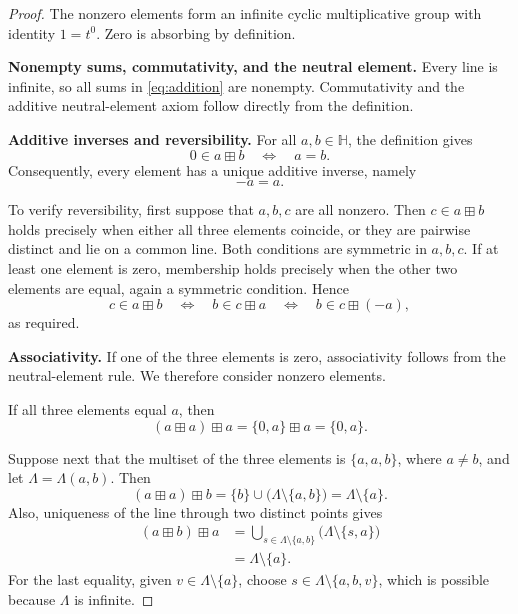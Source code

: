 \documentclass[11pt]{article}
\newcommand{\HH}{\mathbb{H}}
\begin{document}
\begin{proof}
The nonzero elements form an infinite cyclic multiplicative group with
identity \(1=t^0\). Zero is absorbing by definition.

\medskip
\noindent
\textbf{Nonempty sums, commutativity, and the neutral element.}
Every line is infinite, so all sums in \eqref{eq:addition} are nonempty.
Commutativity and the additive neutral-element axiom follow directly from
the definition.

\medskip
\noindent
\textbf{Additive inverses and reversibility.}
For all \(a,b\in\HH\), the definition gives
\begin{equation}\label{eq:inverse}
    0\in a\boxplus b
    \quad\Longleftrightarrow\quad a=b.
\end{equation}
Consequently, every element has a unique additive inverse, namely
\[
    -a=a.
\]

To verify reversibility, first suppose that \(a,b,c\) are all nonzero.
Then \(c\in a\boxplus b\) holds precisely when either all three elements
coincide, or they are pairwise distinct and lie on a common line.
Both conditions are symmetric in \(a,b,c\).
If at least one element is zero, membership holds precisely when the
other two elements are equal, again a symmetric condition. Hence
\[
    c\in a\boxplus b
    \quad\Longleftrightarrow\quad
    b\in c\boxplus a
    \quad\Longleftrightarrow\quad
    b\in c\boxplus(-a),
\]
as required.

\medskip
\noindent
\textbf{Associativity.}
If one of the three elements is zero, associativity follows from the
neutral-element rule. We therefore consider nonzero elements.

If all three elements equal \(a\), then
\[
    (a\boxplus a)\boxplus a
    =\{0,a\}\boxplus a
    =\{0,a\}.
\]

Suppose next that the multiset of the three elements is
\(\{a,a,b\}\), where \(a\neq b\), and let
\(\Lambda=\Lambda(a,b)\). Then
\[
    (a\boxplus a)\boxplus b
    =\{b\}\cup\bigl(\Lambda\setminus\{a,b\}\bigr)
    =\Lambda\setminus\{a\}.
\]
Also, uniqueness of the line through two distinct points gives
\[
\begin{split}
    (a\boxplus b)\boxplus a
    &=
    \bigcup_{s\in\Lambda\setminus\{a,b\}}
        \bigl(\Lambda\setminus\{s,a\}\bigr)\\
    &=\Lambda\setminus\{a\}.
\end{split}
\]
For the last equality, given \(v\in\Lambda\setminus\{a\}\), choose
\(s\in\Lambda\setminus\{a,b,v\}\), which is possible because
\(\Lambda\) is infinite.


\end{proof}
\end{document}
